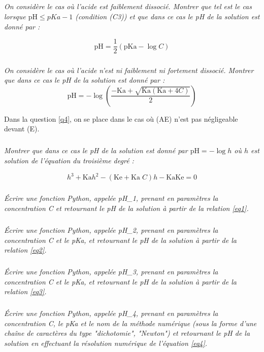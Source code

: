 \documentclass[10pt,fleqn]{article} %
\begin{document}
\begin{multicols}{2}
\subparagraph{\label{q3c}}
\textit{On considère le cas où l’acide est faiblement dissocié. Montrer que tel est le cas lorsque 
$\text{pH} \leq pKa -1$ (condition (C3)) et que dans ce cas le pH de la solution est donné par : }

\begin{equation} \label{eq2}
\text{pH} = \dfrac{1}{2} \left(\text{pKa}- \log C \right)
\end{equation}

\subparagraph{\label{q3d}}
\textit{On considère le cas où l’acide n’est ni faiblement ni fortement dissocié. Montrer que dans ce cas 
le pH de la solution est donné par :}
\begin{equation} \label{eq3}
\text{pH} = - \log \left( \dfrac{-\text{Ka} + \sqrt{\text{Ka}\left( \text{Ka} + 4C\right)}}{2}\right)
\end{equation}


Dans la question \ref{q4},
 on se place dans le cas où (AE) n’est pas négligeable devant (E). 
\subparagraph{\label{q4}}
\textit{Montrer que dans ce cas le pH de la solution est donné par $\text{pH} = - \log h$ où $h$ est solution de l’équation 
du troisième degré :}

\begin{equation} \label{eq4}
h^3 + \text{Ka}h^2 - \left(\text{Ke} + \text{Ka}\; C\right)h - \text{Ka} \text{Ke} = 0
\end{equation}


\subparagraph{\label{q5a}}
\textit{ Écrire une fonction Python, appelée pH\_1, prenant en paramètres la concentration C et retournant 
le pH de la solution à partir de la relation \eqref{eq1}. }

\subparagraph{\label{q5b}}
\textit{Écrire une fonction Python, appelée pH\_2, prenant en paramètres la concentration C et le pKa, 
et retournant le pH de la solution à partir de la relation \eqref{eq2}.}


\subparagraph{\label{q5c}}
\textit{Écrire une fonction Python, appelée pH\_3, prenant en paramètres la concentration C et le pKa, et 
retournant le pH de la solution à partir de la relation \eqref{eq3}.}

\subparagraph{\label{q5d}}
\textit{Écrire une fonction Python, appelée pH\_4, prenant en paramètres la concentration C, le pKa et le 
nom de la méthode numérique (sous la forme d’une chaîne de caractères du type "dichotomie", 
"Newton") et retournant le pH de la solution en effectuant la résolution numérique de l’équation \eqref{eq4}.}


\end{multicols}
\end{document}
